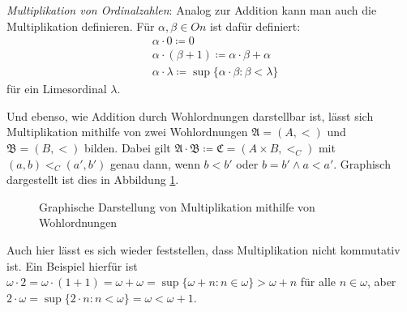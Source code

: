 \textit{Multiplikation von Ordinalzahlen}: Analog zur Addition kann man auch die Multiplikation definieren. Für $\alpha,\beta\in On$ ist dafür definiert:
\begin{align*}
	&\alpha\cdot0\coloneqq 0\\
	&\alpha\cdot(\beta+1)\coloneqq\alpha\cdot\beta+\alpha\\
	&\alpha\cdot\lambda\coloneqq\sup\{\alpha\cdot\beta : \beta<\lambda\}
\end{align*}
für ein Limesordinal $\lambda$.

Und ebenso, wie Addition durch Wohlordnungen darstellbar ist, lässt sich Multiplikation mithilfe von zwei Wohlordnungen $\mathfrak{A}=(A,<)$ und $\mathfrak{B}=(B,<)$ bilden. Dabei gilt $\mathfrak{A}\cdot\mathfrak{B}\coloneqq\mathfrak{C}=(A\times B, <_C)$ mit $(a,b)<_C(a',b')$ genau dann, wenn $b<b'$ oder $b=b'\land a<a'$. Graphisch dargestellt ist dies in Abbildung \ref{MultiplikationWO}.
	
\begin{figure}[h]
	\begin{center}
	\end{center}
	\caption{Graphische Darstellung von Multiplikation mithilfe von Wohlordnungen}
	\label{MultiplikationWO}
\end{figure}

Auch hier lässt es sich wieder feststellen, dass Multiplikation nicht kommutativ ist. Ein Beispiel hierfür ist $\omega\cdot 2=\omega\cdot(1+1)=\omega+\omega=\sup\{\omega+n : n\in\omega\}>\omega+n$ für alle $n\in\omega$, aber $2\cdot\omega=\sup\{2\cdot n : n<\omega\}=\omega<\omega+1$.

